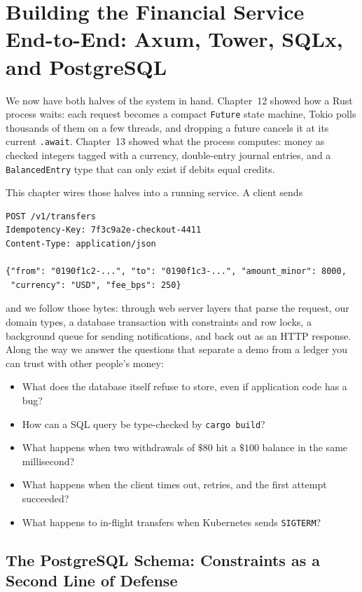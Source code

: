 \chapter{Building the Financial Service End-to-End: Axum, Tower, SQLx, and PostgreSQL}

We now have both halves of the system in hand. Chapter~12 showed how a Rust process waits: each request becomes a compact \texttt{Future} state machine, Tokio polls thousands of them on a few threads, and dropping a future cancels it at its current \texttt{.await}. Chapter~13 showed what the process computes: money as checked integers tagged with a currency, double-entry journal entries, and a \texttt{BalancedEntry} type that can only exist if debits equal credits.

This chapter wires those halves into a running service. A client sends
\begin{lstlisting}[language=Plain]
POST /v1/transfers
Idempotency-Key: 7f3c9a2e-checkout-4411
Content-Type: application/json

{"from": "0190f1c2-...", "to": "0190f1c3-...", "amount_minor": 8000,
 "currency": "USD", "fee_bps": 250}
\end{lstlisting}
and we follow those bytes: through web server layers that parse the request, our domain types, a database transaction with constraints and row locks, a background queue for sending notifications, and back out as an HTTP response. Along the way we answer the questions that separate a demo from a ledger you can trust with other people's money:
\begin{itemize}
  \item What does the database itself refuse to store, even if application code has a bug?
  \item How can a SQL query be type-checked by \texttt{cargo build}?
  \item What happens when two withdrawals of $\$80$ hit a $\$100$ balance in the same millisecond?
  \item What happens when the client times out, retries, and the first attempt succeeded?
  \item What happens to in-flight transfers when Kubernetes sends \texttt{SIGTERM}?
\end{itemize}

\chapterline

\section{The PostgreSQL Schema: Constraints as a Second Line of Defense}
\label{ch14:schema}


